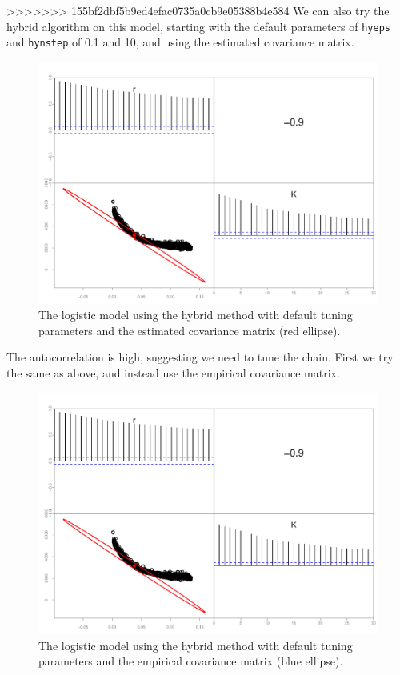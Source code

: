 \documentclass{article}\usepackage[]{graphicx}\usepackage[]{color}
\begin{document}
>>>>>>> 155bf2dbf5b9ed4efac0735a0cb9e05388b4e584
We can also try the hybrid algorithm on this model, starting
with the default parameters of \texttt{hyeps} and
\texttt{hynstep} of 0.1 and 10, and using the estimated
covariance matrix.
\begin{figure}[h]
  \centering
  \includegraphics[width=5in]{../plots/logistic_hy.pdf}
  \caption{The logistic model using the hybrid method with
    default tuning parameters and the estimated covariance matrix
    (red ellipse).}
  \label{fig:logistic_hy}
\end{figure}
The autocorrelation is high, suggesting we need to tune the
chain. First we try the same as above, and instead use the
empirical covariance matrix.
\begin{figure}[h]
  \centering
  \includegraphics[width=5in]{../plots/logistic_hy.pdf}
  \caption{The logistic model using the hybrid method with
    default tuning parameters and the empirical covariance matrix
    (blue ellipse).}
  \label{fig:logistic_hy2}
\end{figure}
\end{document}
